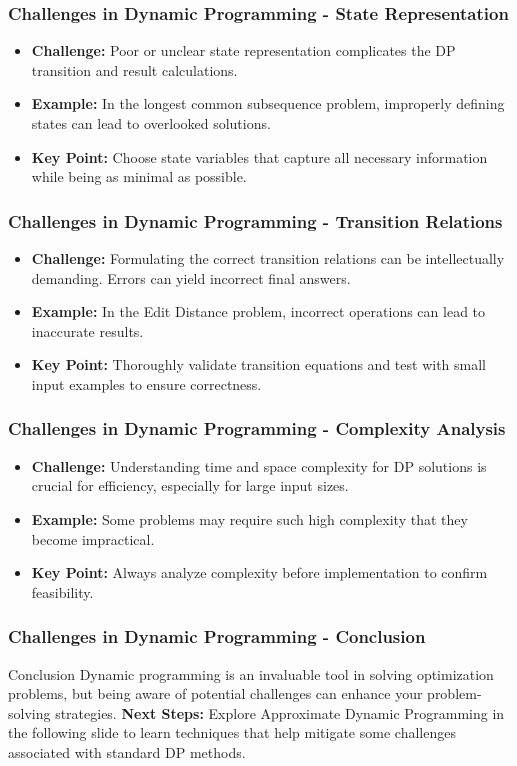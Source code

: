 \documentclass[aspectratio=169]{beamer}
\begin{document}
\begin{frame}[fragile]
    \frametitle{Challenges in Dynamic Programming - State Representation}
    \begin{itemize}
        \item \textbf{Challenge:} Poor or unclear state representation complicates the DP transition and result calculations.
        \item \textbf{Example:} In the longest common subsequence problem, improperly defining states can lead to overlooked solutions.
        \item \textbf{Key Point:} Choose state variables that capture all necessary information while being as minimal as possible.
    \end{itemize}
\end{frame}

\begin{frame}[fragile]
    \frametitle{Challenges in Dynamic Programming - Transition Relations}
    \begin{itemize}
        \item \textbf{Challenge:} Formulating the correct transition relations can be intellectually demanding. Errors can yield incorrect final answers.
        \item \textbf{Example:} In the Edit Distance problem, incorrect operations can lead to inaccurate results.
        \item \textbf{Key Point:} Thoroughly validate transition equations and test with small input examples to ensure correctness.
    \end{itemize}
\end{frame}

\begin{frame}[fragile]
    \frametitle{Challenges in Dynamic Programming - Complexity Analysis}
    \begin{itemize}
        \item \textbf{Challenge:} Understanding time and space complexity for DP solutions is crucial for efficiency, especially for large input sizes.
        \item \textbf{Example:} Some problems may require such high complexity that they become impractical.
        \item \textbf{Key Point:} Always analyze complexity before implementation to confirm feasibility.
    \end{itemize}
\end{frame}

\begin{frame}[fragile]
    \frametitle{Challenges in Dynamic Programming - Conclusion}
    \begin{block}{Conclusion}
        Dynamic programming is an invaluable tool in solving optimization problems, but being aware of potential challenges can enhance your problem-solving strategies. 
        \newline \textbf{Next Steps:} Explore Approximate Dynamic Programming in the following slide to learn techniques that help mitigate some challenges associated with standard DP methods.
    \end{block}
\end{frame}
\end{document}
